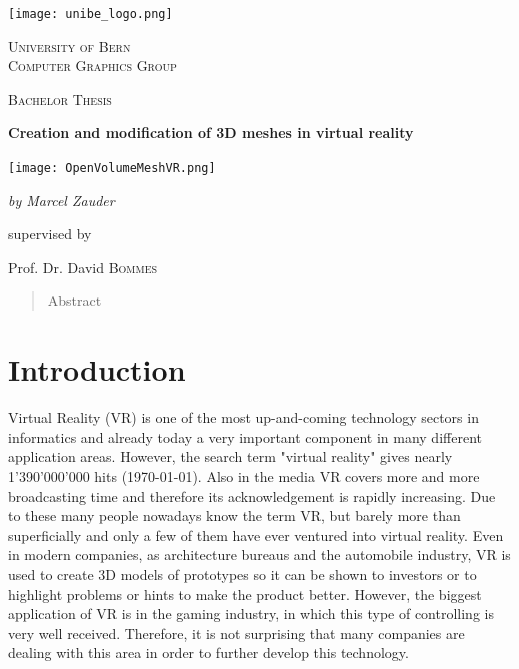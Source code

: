 \documentclass{report}
\begin{document}


\begin{titlepage}
	\centering
	\texttt{[image: unibe\_logo.png]}\par
	\vspace{1cm}
	{\scshape\LARGE University of Bern \\
	\large Computer Graphics Group\par}
	\vspace{1cm}
	{\scshape\Large Bachelor Thesis\par}
	\vspace{1.5cm}
	{\huge\bfseries Creation and modification of 3D meshes in virtual reality\par}
	\vspace{1cm}
	\texttt{[image: OpenVolumeMeshVR.png]}\par 
	\vspace{2cm}
	{\Large\itshape by Marcel Zauder\par}
	\vfill
	supervised by\par
	Prof. Dr. David \textsc{Bommes}
\end{titlepage}

\begin{abstract}
	Abstract
\end{abstract}

\tableofcontents

\chapter{Introduction}
	Virtual Reality (VR) is one of the most up-and-coming technology sectors in informatics and already today a very important component in many different application areas. However, the search term "virtual reality" gives nearly 1'390'000'000 hits (\today). Also in the media VR covers more and more broadcasting time and therefore its acknowledgement is rapidly increasing.  Due to these many people nowadays know the term VR, but barely more than superficially and only a few of them have ever ventured into virtual reality. Even in modern companies, as architecture bureaus and the automobile industry, VR is used to create 3D models of prototypes so it can be shown to investors or to highlight problems or hints to make the product better. However, the biggest application of VR is in the gaming industry, in which this type of controlling is very well received. Therefore, it is not surprising that many companies are dealing with this area in order to further develop this technology.	
	
\end{document}
